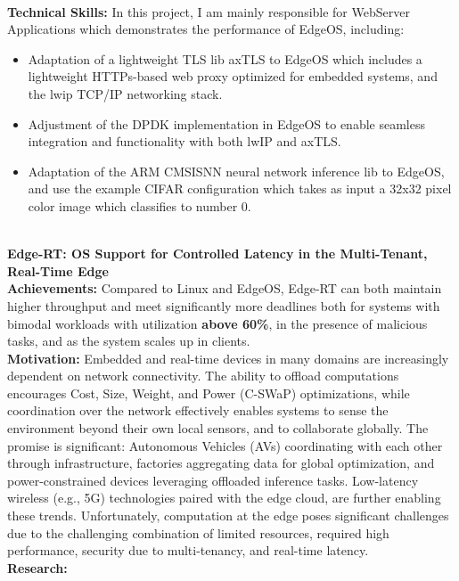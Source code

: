 \vspace{-1.0em}
\
\\
\textbf{\small Technical Skills:}
In this project, I am mainly responsible for WebServer Applications which demonstrates the performance of EdgeOS, including:
\begin{itemize}[leftmargin=*]
    \setlength\itemsep{-0.0em}
	\item Adaptation of a lightweight TLS lib axTLS to EdgeOS which includes a lightweight HTTPs-based web proxy optimized for embedded systems, and the lwip TCP/IP networking stack.
	\item Adjustment of  the DPDK implementation in EdgeOS to enable seamless integration and functionality with both lwIP and axTLS.
	\item Adaptation of the ARM CMSISNN neural network inference lib to EdgeOS, and use the example CIFAR\-10 configuration which takes as input a 32x32 pixel color image which classifies to number 0.
\end{itemize}
\vspace{-1.0em}
\
\\
\textbf{Edge-RT: OS Support for Controlled Latency in the Multi-Tenant, Real-Time Edge}
\\
\textbf{\small Achievements:}
Compared to Linux and EdgeOS, Edge-RT can both maintain higher throughput and meet significantly more deadlines both for systems with bimodal workloads with utilization \textbf{above 60\%}, in the presence of malicious tasks, and as the system scales up in clients.
\\
\textbf{\small Motivation:}
Embedded and real-time devices in many domains are increasingly dependent on network connectivity.
The ability to offload computations encourages Cost, Size, Weight, and Power (C-SWaP) optimizations, while coordination over the network effectively enables systems to sense the environment beyond their own local sensors, and to collaborate globally.
The promise is significant: Autonomous Vehicles (AVs) coordinating with each other through infrastructure, factories aggregating data for global optimization, and power-constrained devices leveraging offloaded inference tasks.
Low-latency wireless (e.g., 5G) technologies paired with the edge cloud, are further enabling these trends.
Unfortunately, computation at the edge poses significant challenges due to the challenging combination of limited resources, required high performance, security due to multi-tenancy, and real-time latency.
\\
\textbf{\small Research:}

